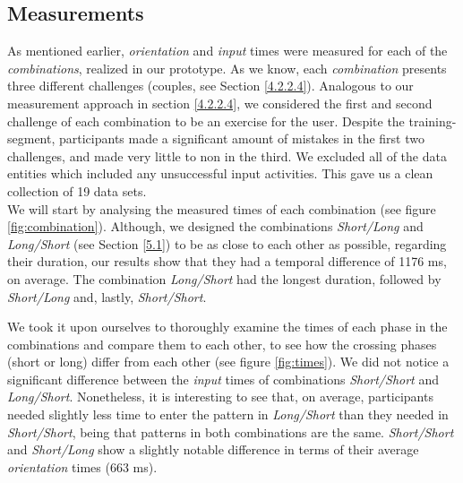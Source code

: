\subsection{Measurements}

 As mentioned earlier, \textit{orientation} and \textit{input} times were measured for each of the \textit{combinations}, realized in our prototype. As we know, each \textit{combination} presents three different challenges (couples, see Section \ref{4.2.2.4}). Analogous to our measurement approach in section \ref{4.2.2.4}, we considered the first and second challenge of each combination to be an exercise for the user. Despite the training-segment, participants made a significant amount of mistakes in the first two challenges, and made very little to non in the third. We excluded all of the data entities which included any unsuccessful input activities. This gave us a clean collection of 19 data sets. \\

We will start by analysing the measured times of each combination (see figure \ref{fig:combination}). Although, we designed the combinations \textit{Short/Long} and \textit{Long/Short} (see Section \ref{5.1}) to be as close to each other as possible, regarding their duration, our results show that they had a temporal difference of 1176 ms, on average. The combination \textit{Long/Short} had the longest duration, followed by \textit{Short/Long} and, lastly, \textit{Short/Short}.

We took it upon ourselves to thoroughly examine the times of each phase in the combinations and compare them to each other, to see how the crossing phases (short or long) differ from each other (see figure \ref{fig:times}). We did not notice a significant difference between the \textit{input} times of combinations \textit{Short/Short} and \textit{Long/Short}. Nonetheless, it is interesting to see that, on average, participants needed slightly less time to enter the pattern in \textit{Long/Short} than they needed in \textit{Short/Short}, being that patterns in both combinations are the same. \textit{Short/Short} and \textit{Short/Long} show a slightly notable difference in terms of their average \textit{orientation} times (663 ms). 

